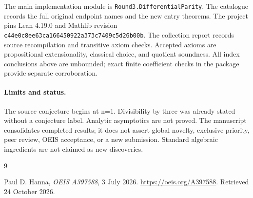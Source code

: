 \documentclass[11pt,a4paper]{article}
\theoremstyle{remark}
\begin{document}
The main implementation module is \nolinkurl{Round3.DifferentialParity}.
The catalogue records the full original endpoint names and the new entry
theorems. The project pins Lean 4.19.0 and Mathlib revision
\nolinkurl{c44e0c8ee63ca166450922a373c7409c5d26b00b}. The collection
report records source recompilation and transitive axiom checks. Accepted
axioms are propositional extensionality, classical choice, and quotient
soundness. All index conclusions above are unbounded; exact finite
coefficient checks in the package provide separate corroboration.

\paragraph{Limits and status.}
The source conjecture begins at n=1. Divisibility by three was already stated without a conjecture label. Analytic asymptotics are not proved.
The manuscript consolidates completed results; it does not assert global
novelty, exclusive priority, peer review, OEIS acceptance, or a new submission.
Standard algebraic ingredients are not claimed as new discoveries.

\begin{thebibliography}{9}
\raggedright
{}
Paul D. Hanna, \emph{OEIS A397588}, 3 July 2026.
\url{https://oeis.org/A397588}. Retrieved 24 October 2026.
\end{thebibliography}
\end{document}
